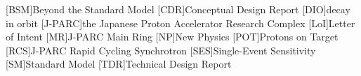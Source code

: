 \begin{acronym}
[BSM]{Beyond the Standard Model}
[CDR]{Conceptual Design Report}
[DIO]{decay in orbit}
[J-PARC]{the Japanese Proton Accelerator Research Complex}
[LoI]{Letter of Intent}
[MR]{J-PARC Main Ring}
[NP]{New Physics}
[POT]{Protons on Target}
[RCS]{J-PARC Rapid Cycling Synchrotron}
[SES]{Single-Event Sensitivity}
[SM]{Standard Model}
[TDR]{Technical Design Report}
\end{acronym}


